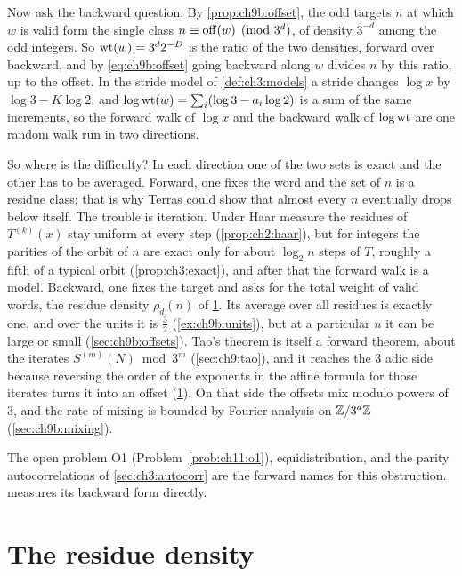 Now ask the backward question. By \cref{prop:ch9b:offset}, the odd targets $n$ at which $w$ is valid form the single class $n\equiv\operatorname{off}(w)\pmod{3^d}$, of density $3^{-d}$ among the odd integers. So $\operatorname{wt}(w)=3^d2^{-D}$ is the ratio of the two densities, forward over backward, and by \eqref{eq:ch9b:offset} going backward along $w$ divides $n$ by this ratio, up to the offset. In the stride model of \cref{def:ch3:models} a stride changes $\log x$ by $\log3-K\log2$, and $\log\operatorname{wt}(w)=\sum_i(\log3-a_i\log2)$ is a sum of the same increments, so the forward walk of $\log x$ and the backward walk of $\log\operatorname{wt}$ are one random walk run in two directions.

So where is the difficulty? In each direction one of the two sets is exact and the other has to be averaged. Forward, one fixes the word and the set of $n$ is a residue class; that is why Terras could show that almost every $n$ eventually drops below itself. The trouble is iteration. Under Haar measure the residues of $T^{(k)}(x)$ stay uniform at every step (\cref{prop:ch2:haar}), but for integers the parities of the orbit of $n$ are exact only for about $\log_2n$ steps of $T$, roughly a fifth of a typical orbit (\cref{prop:ch3:exact}), and after that the forward walk is a model. Backward, one fixes the target and asks for the total weight of valid words, the residue density $\rho_d(n)$ of \cref{sec:ch9b:density}. Its average over all residues is exactly one, and over the units it is $\frac32$ (\cref{ex:ch9b:units}), but at a particular $n$ it can be large or small (\cref{sec:ch9b:offsets}). Tao's theorem is itself a forward theorem, about the iterates $S^{(m)}(N)\bmod3^m$ (\cref{sec:ch9:tao}), and it reaches the $3$ adic side because reversing the order of the exponents in the affine formula for those iterates turns it into an offset (\cref{sec:ch9b:density}). On that side the offsets mix modulo powers of $3$, and the rate of mixing is bounded by Fourier analysis on $\mathbb{Z}/3^d\mathbb{Z}$ (\cref{sec:ch9b:mixing}).

The open problem O1 (Problem~\ref{prob:ch11:o1}), equidistribution, and the parity autocorrelations of \cref{sec:ch3:autocorr} are the forward names for this obstruction.  measures its backward form directly.

\section{The residue density}\label{sec:ch9b:density}

